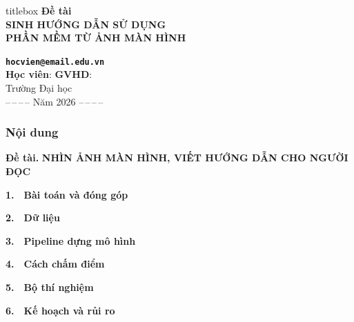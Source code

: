 \documentclass[10pt]{beamer}
\newcommand{\chred}[1]{{\color{chapred}\textbf{#1}}}
\newcommand{\tocline}[2]{{\large\color{dnteal}\textbf{#1}}~~{\large\color{daunavy}\textbf{#2}}\par\vspace{2.1ex}}
\begin{document}
\begin{frame}
  \vspace*{-1.0ex}
  \noindent\hspace*{-\dimexpr(\paperwidth-\textwidth)/2\relax}%
  {\setlength{\fboxsep}{0pt}\colorbox{daunavy}{}}
  \vspace{2.6ex}
  \begin{center}
  \begin{beamercolorbox}[wd=\textwidth,rounded=true,shadow=true,center]{titlebox}
    \vspace{3.2ex}
    {\bfseries\large Đề tài}\\[2.4ex]
    {\bfseries\LARGE SINH HƯỚNG DẪN SỬ DỤNG}\\[1.2ex]
    {\bfseries\LARGE PHẦN MỀM TỪ ẢNH MÀN HÌNH}
    \vspace{3.2ex}
  \end{beamercolorbox}

  \vspace{3.4ex}
  {\color{vdblue}\texttt{\bfseries hocvien@email.edu.vn}}\\[1.8ex]
  {\textbf{Học viên}: \makebox[0.16\paperwidth]{\dotfill}\quad \textbf{GVHD}: \makebox[0.16\paperwidth]{\dotfill}}\\[2.8ex]
  {\small Trường Đại học \makebox[0.3\paperwidth]{\dotfill}}\\[1.4ex]
  {\small --\,--\,--\,-- Năm 2026 --\,--\,--\,--}
  \end{center}
\end{frame}

\begin{frame}
  \frametitle{Nội dung}
  \begin{block}{}
    \chred{Đề tài.} {\color{vdblue}\textbf{NHÌN ẢNH MÀN HÌNH, VIẾT HƯỚNG DẪN CHO NGƯỜI ĐỌC}}
  \end{block}
  \vspace{2.4ex}
  {\setlength{\leftskip}{2.4em}
    \tocline{1.}{Bài toán và đóng góp}
    \tocline{2.}{Dữ liệu}
    \tocline{3.}{Pipeline dựng mô hình}
    \tocline{4.}{Cách chấm điểm}
    \tocline{5.}{Bộ thí nghiệm}
    \tocline{6.}{Kế hoạch và rủi ro}
  \par}
\end{frame}
\end{document}
